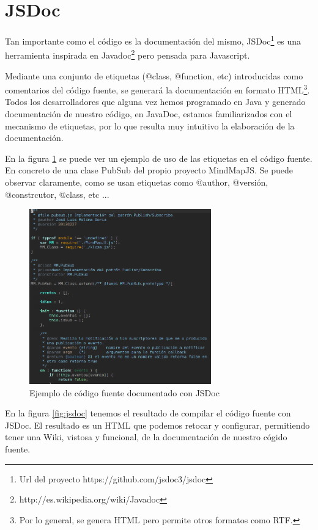 \section{JSDoc}

Tan importante como el código es la documentación del mismo, JSDoc\footnote{Url del proyecto https://github.com/jsdoc3/jsdoc} es una herramienta inspirada en Javadoc\footnote{http://es.wikipedia.org/wiki/Javadoc} pero pensada para Javascript. 

Mediante una conjunto de etiquetas (@class, @function, etc) introducidas como comentarios del código fuente,  se generará la documentación en formato HTML\footnote{Por lo general, se genera HTML pero permite otros formatos como RTF.}. Todos los desarrolladores que alguna vez hemos programado en Java y generado documentación de nuestro código, en JavaDoc, estamos familiarizados con el mecanismo de etiquetas, por lo que resulta muy intuitivo la elaboración de la documentación. 

En la figura \ref{fig:codigoconjsdoc} se puede ver un ejemplo de uso de las etiquetas en el código fuente. En concreto de una clase PubSub del propio proyecto MindMapJS. Se puede observar claramente, como se usan etiquetas como @author, @versión, @constrcutor, @class, etc ...  

\begin{figure}[htbp]
\centering
\includegraphics[width=0.7\textwidth]{imagenes/codigoconjsdoc}
\caption{Ejemplo de código fuente documentado con JSDoc}
\label{fig:codigoconjsdoc}
\end{figure}


En la figura \ref{fig:jsdoc} tenemos el resultado de compilar el código fuente con JSDoc. El resultado es un HTML que podemos retocar y configurar, permitiendo tener una Wiki, vistosa y funcional, de la documentación de nuestro cógido fuente.

